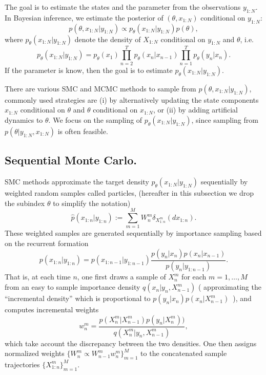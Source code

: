 \documentclass[12pt]{article}
\def\phat{\widehat{p}}
\begin{document}
The goal is to estimate the states and the parameter from the observations $y_{1:N}$. In Bayesian inference, we estimate the posterior of $(\theta, x_{1:N})$ conditional on $y_{1:N}$:
\[
p(\theta, x_{1:N} | y_{1:N}) \propto p_\theta(x_{1:N} | y_{1:N}) p(\theta),
\]
where $p_\theta(x_{1:N} | y_{1:N})$ denote the density of $X_{1:N}$ conditional on $y_{1:N}$ and $\theta$, i.e. 
\[
p_\theta(x_{1:N} | y_{1:N}) = p_\theta(x_1) \prod_{n=2}^T p_\theta(x_{n}|x_{n-1})  \prod_{n=1}^T p_\theta(y_{n}|x_{n}). 
\]
If the parameter is know, then the goal is to estimate $p_\theta(x_{1:N} | y_{1:N}) $. 


There are various SMC and MCMC methods to sample from $p(\theta, x_{1:N} | y_{1:N})$, commonly used strategies are (i) by alternatively updating the state components $x_{1:N}$ conditional on $\theta$ and $\theta$ conditional on $x_{1:N}$, or (ii) by adding artificial dynamics to $\theta$. We focus on the sampling of $p_\theta(x_{1:N} | y_{1:N}) $, since sampling from $p(\theta|y_{1:N}, x_{1:N})$ is often feasible. 

%
\subsection{Sequential Monte Carlo.}  
%
SMC methods approximate the target density $p_\theta(x_{1:N} | y_{1:N}) $  sequentially by weighted random samples called particles, (hereafter in this subsection we drop the subindex $\theta$ to simplify the notation)
\[
\phat(x_{1:n} | y_{1:n}) :=\sum_{m=1}^M W_n^m \delta_{X^m_{1:n}} (dx_{1:n}).
\]
These weighted samples are generated sequentially by importance sampling based on the recurrent formation 
 \begin{equation}
p(x_{1:n}|y_{1:n})=p(x_{1:n-1}|y_{1:n-1})\frac{p\left( y_{n}|x_{n}\right)
p(x_{n}|x_{n-1})}{p(y_{n}|y_{1:n-1})}.  \label{RecHMM}
\end{equation}
That is, at each time $n$, one first draws a sample of $X_n^m$ for each $m=1,\dots,M$ from an easy to sample importance density $q(x_n|y_n, X_{n-1}^m)$ ( approximating the ``incremental density'' which is proportional to $p\left( y_{n}|x_{n}\right)p(x_{n}|X^m_{n-1})$\ ), and computes incremental weights 
\begin{equation*}\label{eq:wt_incr_smc}
w_n^m= \frac{p(X_n^m|X_{n-1}^m)p(y_n|X_n^m))}{q(X_n^m|y_n, X_{n-1}^m)}, %
\end{equation*}
which take account the discrepancy between the two densities. One then assigns normalized weights $\{W_n^m \propto W_{n-1}^m w_n^m\}_{m=1}^M$ to the concatenated sample trajectories $\{X_{1:n}^m\}_{m=1}^M$. 
\end{document}
